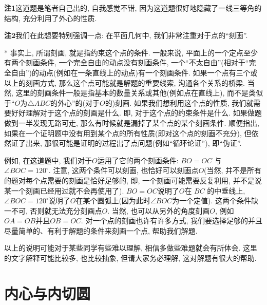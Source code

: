 \documentclass{book}
\begin{document}
\begin{paracol}{2}
\switchcolumn*
\textbf{注1}\quad 这道题是笔者自己出的, 自我感觉不错, 因为这道题很好地隐藏了一线三等角的结构, 充分利用了外心的性质. \par
\textbf{注2}\quad 我们在此想要特别强调一点: 在平面几何中, 我们非常注重对于点的“刻画”.\par
\switchcolumn[0]*
事实上, 所谓刻画, 就是指约束这个点的条件. 一般来说, 平面上的一个定点至少有两个刻画条件, 一个完全自由的动点没有刻画条件, 一个“不太自由”(相对于“完全自由”)的动点(例如在一条直线上的动点)有一个刻画条件. 如果一个点有三个或以上的刻画方式, 那么这个点可能就是解题的重要线索, 沟通各个关系的桥梁. 当然, 这里的刻画条件一般是指基本的数量关系或其他(例如点在直线上), 而不是类似于“$O$为$\triangle ABC$的外心”的(对于$O$的)刻画. 如果我们想利用这个点的性质, 我们就需要好好理解对于这个点的刻画是什么. 即, 对于这个点的约束条件是什么. 如果做题做到一半发现无路可走, 那么有时候就是漏掉了某个点的某个刻画条件. 顺便指出, 如果在一个证明题中没有用到某个点的所有性质(即对这个点的刻画不充分), 但依然证了出来, 那很可能是证明的过程出了点问题(例如“循环论证”), 即“伪证”.\par
例如, 在这道题中, 我们对于$O$运用了它的两个刻画条件: $BO=OC$ 与 $\angle BOC=120^\circ$. 注意, 这两个条件可以刻画, 也恰好可以刻画点$O$(当然, 并不是所有的题对每个点需要的刻画是恰好足够的, 即, 一个刻画可能需要反复利用, 并不是说某一个刻画已经用过就不会再使用了). $BO=OC$说明了$O$在 $BC$ 的中垂线上, $\angle BOC=120^\circ$说明了$O$在某个圆弧上(因为此时$\angle BOC$为一个定值). 这两个条件缺一不可, 否则就无法充分刻画点$O$. 当然, 也可以从另外的角度刻画$O$, 例如$OA=OB$并且$OB=OC$. 对一个点的刻画也许有许多方式, 我们要选择足够的并且尽量简单的、有利于解题的条件来刻画一个点, 帮助我们解题.\par
以上的说明可能对于某些同学有些难以理解, 相信多做些难题就会有所体会.
\switchcolumn
{\kaishu 这里的文字解释可能比较多, 也比较抽象, 但请大家务必理解, 这对解题有很大的帮助.}

\end{paracol}

\section{内心与内切圆}
\end{document}

